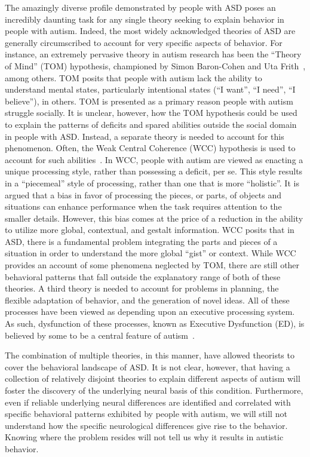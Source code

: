 The amazingly diverse profile demonstrated by people with ASD poses an incredibly daunting task for any single theory seeking to explain behavior in people with autism.  Indeed, the most widely acknowledged theories of ASD are generally circumscribed to account for very specific aspects of behavior.  For instance, an extremely pervasive theory in autism research has been the ``Theory of Mind'' (TOM) hypothesis, championed by Simon Baron-Cohen and Uta Frith~\cite{Baron-Cohen:1985:AutismTOM}, among others.  TOM posits that people with autism lack the ability to understand mental states, particularly intentional states (``I want'', ``I need'', ``I believe''), in others.  TOM is presented as a primary reason people with autism struggle socially. It is unclear, however, how the TOM hypothesis could be used to explain the patterns of deficits and spared abilities outside the social domain in people with ASD.  Instead, a separate theory is needed to account for this phenomenon. Often, the Weak Central Coherence (WCC) hypothesis is used to account for such abilities~\cite{RefWorks:37}.  In WCC, people with autism are viewed as enacting a unique processing style, rather than possessing a deficit, per se.  This style results in a ``piecemeal'' style of processing, rather than one that is more ``holistic''.  It is argued that a bias in favor of processing the pieces, or parts, of objects and situations can enhance performance when the task requires attention to the smaller details.  However, this bias comes at the price of a reduction in the ability to utilize more global, contextual, and gestalt information.  WCC posits that in ASD, there is a fundamental problem integrating the parts and pieces of a situation in order to understand the more global ``gist'' or context.  While WCC provides an account of some phenomena neglected by TOM, there are still other behavioral patterns that fall outside the explanatory range of both of these theories.  A third theory is needed to account for problems in planning, the flexible adaptation of behavior, and the generation of novel ideas.  All of these processes have been viewed as depending upon an executive processing system.  As such, dysfunction of these processes, known as Executive Dysfunction (ED), is believed by some to be a central feature of autism~\cite{HughesC:1994:AutismExecutiveDysfunction,HillEL:2004:AutismExecutiveDysfunction,Ozonoff:1991:AutismExecutiveDysfunction}.  

The combination of multiple theories, in this manner, have allowed theorists to cover the behavioral landscape of ASD.   It is not clear, however, that having a collection of relatively disjoint theories to explain different aspects of autism will foster the discovery of the underlying neural basis of this condition.  Furthermore, even if reliable underlying neural differences are identified and correlated with specific behavioral patterns exhibited by people with autism, we will still not understand how the specific neurological differences give rise to the behavior.  Knowing where the problem resides will not tell us why it results in autistic behavior.  

